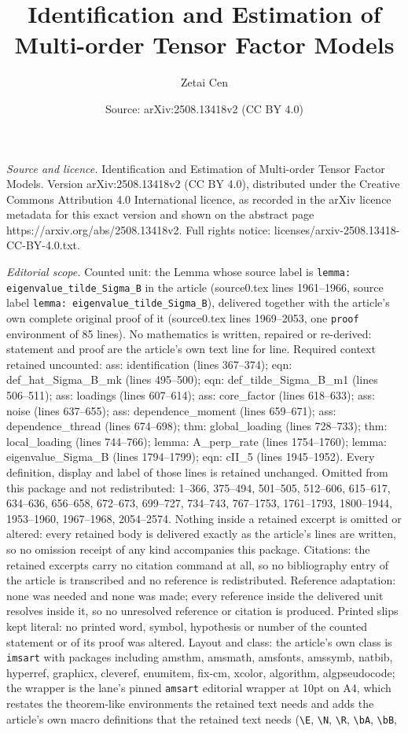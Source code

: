 \documentclass[10pt,a4paper]{amsart}
\title[Identification and Estimation of Multi-order Tensor Factor M]{Identification and Estimation of Multi-order Tensor Factor Models}
\author{Zetai Cen}
\date{Source: arXiv:2508.13418v2 (CC BY 4.0)}
\begin{document}
\maketitle

\noindent\emph{Source and licence.} Identification and Estimation of Multi-order Tensor Factor Models. Version arXiv:2508.13418v2 (CC BY 4.0), distributed under the Creative Commons Attribution 4.0 International licence, as recorded in the arXiv licence metadata for this exact version and shown on the abstract page https://arxiv.org/abs/2508.13418v2. Full rights notice: licenses/arxiv-2508.13418-CC-BY-4.0.txt.\par\smallskip

\noindent\textit{Editorial scope.} Counted unit: the Lemma whose source label is \texttt{lemma: eigenvalue\_tilde\_Sigma\_B} in the article (source0.tex lines 1961--1966, source label \texttt{lemma: eigenvalue\_tilde\_Sigma\_B}), delivered together with the article's own complete original proof of it (source0.tex lines 1969--2053, one \texttt{proof} environment of 85 lines). No mathematics is written, repaired or re-derived: statement and proof are the article's own text line for line. Required context retained uncounted: ass: identification (lines 367--374); eqn: def\_hat\_Sigma\_B\_mk (lines 495--500); eqn: def\_tilde\_Sigma\_B\_m1 (lines 506--511); ass: loadings (lines 607--614); ass: core\_factor (lines 618--633); ass: noise (lines 637--655); ass: dependence\_moment (lines 659--671); ass: dependence\_thread (lines 674--698); thm: global\_loading (lines 728--733); thm: local\_loading (lines 744--766); lemma: A\_perp\_rate (lines 1754--1760); lemma: eigenvalue\_Sigma\_B (lines 1794--1799); eqn: cII\_5 (lines 1945--1952). Every definition, display and label of those lines is retained unchanged. Omitted from this package and not redistributed: 1--366, 375--494, 501--505, 512--606, 615--617, 634--636, 656--658, 672--673, 699--727, 734--743, 767--1753, 1761--1793, 1800--1944, 1953--1960, 1967--1968, 2054--2574. Nothing inside a retained excerpt is omitted or altered: every retained body is delivered exactly as the article's lines are written, so no omission receipt of any kind accompanies this package. Citations: the retained excerpts carry no citation command at all, so no bibliography entry of the article is transcribed and no reference is redistributed. Reference adaptation: none was needed and none was made; every reference inside the delivered unit resolves inside it, so no unresolved reference or citation is produced. Printed slips kept literal: no printed word, symbol, hypothesis or number of the counted statement or of its proof was altered. Layout and class: the article's own class is \texttt{imsart} with packages including amsthm, amsmath, amsfonts, amssymb, natbib, hyperref, graphicx, cleveref, enumitem, fix-cm, xcolor, algorithm, algpseudocode; the wrapper is the lane's pinned \texttt{amsart} editorial wrapper at 10pt on A4, which restates the theorem-like environments the retained text needs and adds the article's own macro definitions that the retained text needs (\texttt{\textbackslash E}, \texttt{\textbackslash N}, \texttt{\textbackslash R}, \texttt{\textbackslash bA}, \texttt{\textbackslash bB}, 
\end{document}
